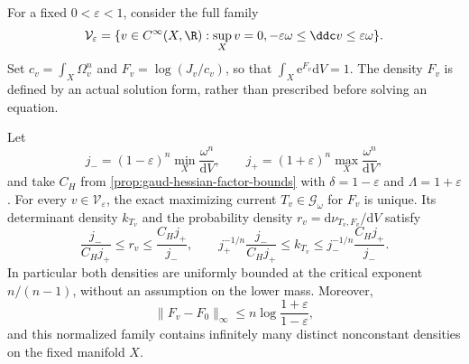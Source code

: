 For a fixed $0<\varepsilon<1$, consider the full family
\begin{equation}\label{eq:gaud-controlled-hessian-family}
 \mathcal V_\varepsilon=
 \{v\in C^\infty(X,\R):\sup_Xv=0,
                    -\varepsilon\omega\leq\ddc v\leq\varepsilon\omega\}.
\end{equation}
Set $c_v=\int_X\Omega_v^n$ and $F_v=\log(J_v/c_v)$, so that $\int_X\mathrm e^{F_v}\mathrm{d}V=1$. The density $F_v$ is defined by an actual solution form, rather than prescribed before solving an equation.

\begin{theorem}\label{thm:gaud-hessian-adjoint-endpoint}
Let
\[
 j_-=(1-\varepsilon)^n\min_X\frac{\omega^n}{\mathrm{d}V},
 \qquad j_+=(1+\varepsilon)^n\max_X\frac{\omega^n}{\mathrm{d}V},
\]
and take $C_H$ from \cref{prop:gaud-hessian-factor-bounds} with $\delta=1-\varepsilon$ and $\Lambda=1+\varepsilon$. For every $v\in\mathcal V_\varepsilon$, the exact maximizing current $T_v\in\mathscr G_\omega$ for $F_v$ is unique. Its determinant density $k_{T_v}$ and the probability density $r_v=\mathrm d\nu_{T_v,F_v}/\mathrm{d}V$ satisfy
\begin{equation}\label{eq:gaud-hessian-adjoint-bounds}
 \frac{j_-}{C_Hj_+}\leq r_v\leq\frac{C_Hj_+}{j_-},
 \qquad
 j_+^{-1/n}\frac{j_-}{C_Hj_+}
 \leq k_{T_v}\leq j_-^{-1/n}\frac{C_Hj_+}{j_-}.
\end{equation}
In particular both densities are uniformly bounded at the critical exponent $n/(n-1)$, without an assumption on the lower mass. Moreover,
\[
 \|F_v-F_0\|_\infty
       \leq n\log\frac{1+\varepsilon}{1-\varepsilon},
\]
and this normalized family contains infinitely many distinct nonconstant densities on the fixed manifold $X$.
\end{theorem}
